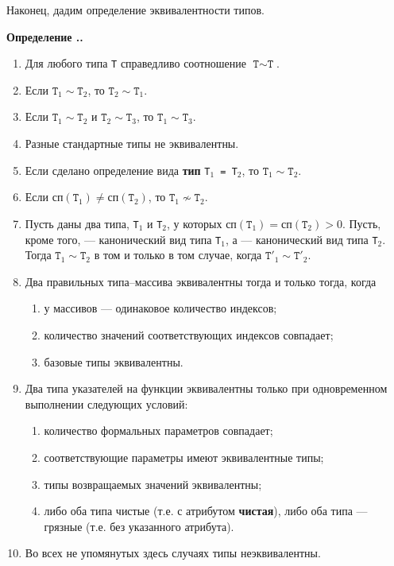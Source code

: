 \documentclass[10pt]{report}
\newcounter{defin}[section]
\renewcommand{\thedefin}{\thesection.\arabic{defin}}
\newenvironment{Definition}{\par\refstepcounter{defin}\bf Определение \thedefin.\sl}{\rm\par}
\begin{document}
Наконец, дадим определение эквивалентности типов.
\begin{Definition}
	\renewcommand{\theenumii}{\asbuk{enumii}}
	\renewcommand{\labelenumii}{\theenumii)}
	\begin{enumerate}
		\item Для любого типа \texttt{T} справедливо соотношение ${\texttt{T}}\sim{\texttt{T}}$.
		\item Если ${\texttt{T}}_1\sim{\texttt{T}}_2$, то ${\texttt{T}}_2\sim{\texttt{T}}_1$.
		\item Если ${\texttt{T}}_1\sim{\texttt{T}}_2$ и ${\texttt{T}}_2\sim{\texttt{T}}_3$, то ${\texttt{T}}_1\sim{\texttt{T}}_3$.
		\item Разные стандартные типы не эквивалентны.
		\item Если сделано определение вида \textbf{тип} \texttt{T$_1$ = T$_2$}, то ${\texttt{T}}_1\sim{\texttt{T}}_2$.
		\item Если $\texttt{сп}({\texttt{T}}_1)\neq\texttt{сп}({\texttt{T}}_2)$, то ${\texttt{T}}_1\not\sim{\texttt{T}}_2$.
		\item Пусть даны два типа, \texttt{T$_1$} и \texttt{T$_2$}, у которых $\texttt{сп}({\texttt{T}}_1)=\texttt{сп}({\texttt{T}}_2)>0$. Пусть, кроме того,
		\textcolor{Green}{} --- канонический вид типа \texttt{T$_1$}, а
		\textcolor{Green}{} --- канонический вид типа \texttt{T$_2$}. Тогда ${\texttt{T}}_1\sim{\texttt{T}}_2$
		в том и только в том случае, когда ${\texttt{T}}'_1\sim{\texttt{T}}'_2$.
		\item Два правильных типа--массива эквивалентны тогда и только тогда, когда
		\begin{enumerate}
			\item у массивов --- одинаковое количество индексов;
			\item количество значений соответствующих индексов совпадает;
			\item базовые типы эквивалентны.
		\end{enumerate}
		\item Два типа указателей на функции эквивалентны только при одновременном выполнении следующих условий:
		\begin{enumerate}
			\item количество формальных параметров совпадает;
			\item соответствующие параметры имеют эквивалентные типы;
			\item типы возвращаемых значений эквивалентны;
			\item либо оба типа чистые (т.е. с атрибутом \textbf{чистая}), либо оба типа --- грязные (т.е. без указанного атрибута).
		\end{enumerate}
		\item Во всех не упомянутых здесь случаях типы неэквивалентны.
	\end{enumerate}
\end{Definition}
\end{document}
